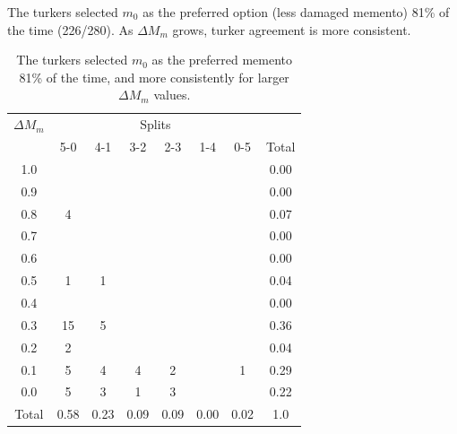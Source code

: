 The turkers selected $m_0$ as the preferred option (less damaged memento) 81\% of the time (226/280). As {$\Delta M_m$} grows, turker agreement is more consistent. 


\begin{table}
\begin{tabular}{ c | c | c | c | c | c | c || c}
    {$\Delta M_m$} &  \multicolumn{6}{c}{Splits}\\
  & 5-0 & 4-1 & 3-2 & 2-3 & 1-4 & 0-5 & Total\\
\hline
1.0   &  &  &  &  &  & & 0.00\\
0.9 &  &  &  &  &  & & 0.00\\
0.8 & 4 &  &  &  &  & & 0.07\\
0.7 &  &  &  &  &  & & 0.00\\
0.6 &  &  &  &  &  & & 0.00\\
0.5 & 1 & 1 &  &  &  & & 0.04\\
0.4 &  &  &  &  &  & & 0.00\\
0.3 & 15 & 5 &  &  &  & & 0.36\\
0.2 & 2 &  &  &  &  & & 0.04\\
0.1 & 5 & 4 & 4 & 2 &  & 1& 0.29\\
0.0 & 5 & 3 & 1 & 3 &  & & 0.22\\
\hline
Total & 0.58 & 0.23 & 0.09 & 0.09 & 0.00 & 0.02 & 1.0
\end{tabular}
  \caption{The turkers selected $m_0$ as the preferred memento 81\% of the time, and more consistently for larger {$\Delta M_m$} values.}
  \label{m0table}
\end{table}


